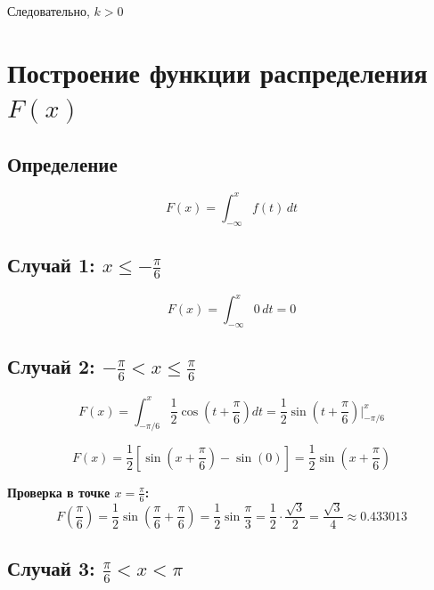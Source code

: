 \documentclass[12pt,a4paper]{article}
\begin{document}
Следовательно, $k > 0$

\section{Построение функции распределения $F(x)$}

\subsection*{Определение}

\begin{equation}
F(x) = \int_{-\infty}^{x} f(t)\,dt
\end{equation}

\subsection*{Случай 1: $x \leq -\frac{\pi}{6}$}

\begin{equation}
F(x) = \int_{-\infty}^{x} 0\,dt = 0
\end{equation}

\subsection*{Случай 2: $-\frac{\pi}{6} < x \leq \frac{\pi}{6}$}

\begin{equation}
F(x) = \int_{-\pi/6}^{x} \frac{1}{2}\cos\left(t+\frac{\pi}{6}\right)dt = \frac{1}{2}\sin\left(t+\frac{\pi}{6}\right)\Big|_{-\pi/6}^{x}
\end{equation}

\begin{equation}
F(x) = \frac{1}{2}\left[\sin\left(x+\frac{\pi}{6}\right) - \sin(0)\right] = \frac{1}{2}\sin\left(x+\frac{\pi}{6}\right)
\end{equation}

\textbf{Проверка в точке $x = \frac{\pi}{6}$:}
\begin{equation}
F\left(\frac{\pi}{6}\right) = \frac{1}{2}\sin\left(\frac{\pi}{6}+\frac{\pi}{6}\right) = \frac{1}{2}\sin\frac{\pi}{3} = \frac{1}{2} \cdot \frac{\sqrt{3}}{2} = \frac{\sqrt{3}}{4} \approx 0.433013
\end{equation}

\subsection*{Случай 3: $\frac{\pi}{6} < x < \pi$}
\end{document}
